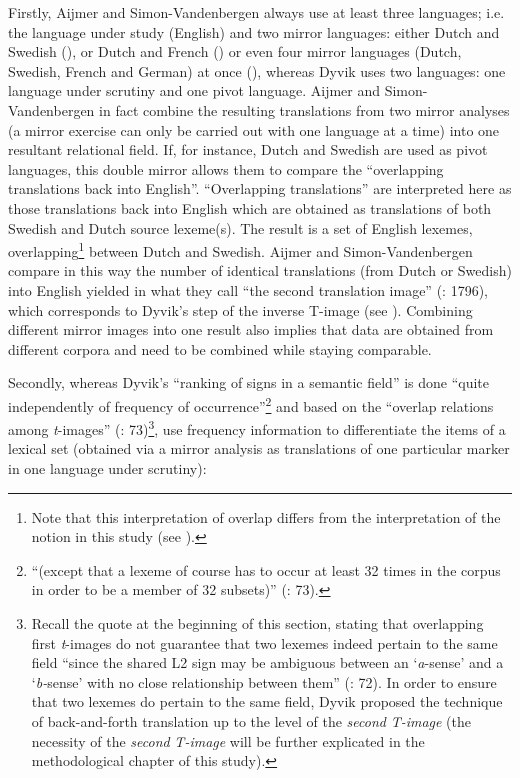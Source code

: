 Firstly, Aijmer and Simon-Vandenbergen always use at least three languages; i.e. the language under study (English) and two mirror languages: either Dutch and Swedish (\citealt{aijmer_model_2004}), or Dutch and French (\citealt{simon-vandenbergen_english_2013}) or even four mirror languages (Dutch, Swedish, French and German) at once (\citealt{simon-vandenbergen_semantic_2007}), whereas Dyvik uses two languages: one language under scrutiny and one pivot language. Aijmer and Simon-Vandenbergen in fact combine the resulting translations from two mirror analyses (a mirror exercise can only be carried out with one language at a time) into one resultant relational field. If, for instance, Dutch and Swedish are used as pivot languages, this double mirror allows them to compare the “overlapping translations back into English”. “Overlapping translations” are interpreted here as those translations back into English which are obtained as translations of both Swedish and Dutch source lexeme(s). The result is a set of English lexemes, overlapping\footnote{Note that this interpretation of overlap differs from the interpretation of the notion in this study (see ).} between Dutch and Swedish. Aijmer and Simon-Vandenbergen compare in this way the number of identical translations (from Dutch or Swedish) into English yielded in what they call “the second translation image” (\citealt{aijmer_model_2004}: 1796), which corresponds to Dyvik’s step of the inverse T-image (see ). Combining different mirror images into one result also implies that data are obtained from different corpora and need to be combined while staying comparable.



Secondly, whereas Dyvik’s “ranking of signs in a semantic field” is done “quite independently of frequency of occurrence”\footnote{“(except that a lexeme of course has to occur at least 32 times in the corpus in order to be a member of 32 subsets)” (\citealt{johansson_translational_1998}: 73).} and based on the “overlap relations among \textit{t}{}-images” (\citealt{johansson_translational_1998}: 73)\footnote{Recall the quote at the beginning of this section, stating that overlapping first \textit{t}{}-images do not guarantee that two lexemes indeed pertain to the same field “since the shared L2 sign may be ambiguous between an ‘\textit{a}{}-sense’ and a ‘\textit{b-}sense’ with no close relationship between them” (\citealt{johansson_translational_1998}: 72). In order to ensure that two lexemes do pertain to the same field, Dyvik proposed the technique of back-and-forth translation up to the level of the \textit{second} \textit{T-image} (the necessity of the \textit{second} \textit{T-image} will be further explicated in the methodological chapter of this study).}, \citet{aijmer_model_2004} use frequency information to differentiate the items of a lexical set (obtained via a mirror analysis as translations of one particular marker in one language under scrutiny): 



